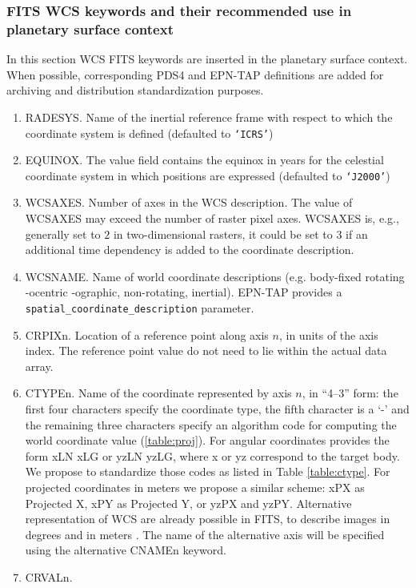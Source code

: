 \subsubsection{FITS WCS keywords and their recommended use in planetary surface context}
\label{sssec:wcskeys}
In this section WCS FITS keywords are inserted in the planetary surface context.
When possible, corresponding PDS4 and EPN-TAP definitions are added for archiving
and distribution standardization purposes.
\begin{enumerate}
\item{RADESYS.
Name of the inertial reference frame with respect to which the coordinate
system is defined (defaulted to \texttt{`ICRS'})}
\item{EQUINOX.
The value field contains the equinox in years for the celestial
coordinate system in which positions are expressed (defaulted to \texttt{`J2000'})}
\item{WCSAXES.
Number of axes in the WCS description.
The value of WCSAXES may exceed the number of raster pixel axes. WCSAXES is, e.g.,
generally set to $2$ in two-dimensional rasters, it could be set to $3$ if an
additional time dependency is added to the coordinate description.}
\item{WCSNAME.
Name of world coordinate descriptions (e.g. body-fixed rotating -ocentric -ographic,
non-rotating, inertial).
EPN-TAP provides a \texttt{spatial\_coordinate\_description} parameter.}
\item{CRPIXn.
Location of a reference point along axis $n$, in units of the axis index.
The reference point value do not need to lie within the actual data array.}
\item{CTYPEn.
Name of the coordinate represented by axis $n$, in ``4--3'' form: the first four
characters specify the coordinate type, the fifth character is a `-' and the
remaining three characters specify an algorithm code for computing the world coordinate
value (\ref{table:proj}).
For angular coordinates \citet{calagreisenI} provides the form xLN xLG or yzLN yzLG,
where x or yz correspond to the target body.
We propose to standardize those codes as listed in Table \ref{table:ctype}.
For projected coordinates in meters we propose a similar scheme: xPX as Projected X,
xPY as Projected Y, or yzPX and yzPY.
Alternative representation of WCS are already possible in FITS, to describe images in
degrees and in meters \citep{greisencalaII}.
The name of the alternative axis will be specified using the alternative CNAMEn
keyword.}
\item{CRVALn.
}
\end{enumerate}
